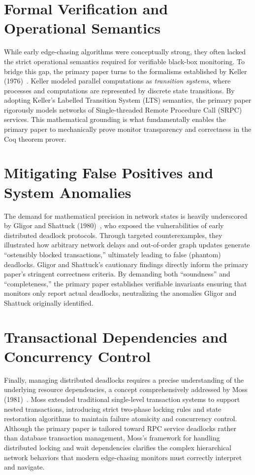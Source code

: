 \documentclass{llncs}
\begin{document}
\section{Formal Verification and Operational Semantics}

While early edge-chasing algorithms were conceptually strong, they often
lacked the strict operational semantics required for verifiable
black-box monitoring. To bridge this gap, the primary paper turns to the
formalisms established by Keller (1976)~\cite{37formals}. Keller modeled
parallel computations as \emph{transition systems}, where processes and
computations are represented by discrete state transitions. By adopting
Keller's Labelled Transition System (LTS) semantics, the primary paper
rigorously models networks of Single-threaded Remote Procedure Call
(SRPC) services. This mathematical grounding is what fundamentally
enables the primary paper to mechanically prove monitor transparency and
correctness in the Coq theorem prover.

\section{Mitigating False Positives and System Anomalies}

The demand for mathematical precision in network states is heavily
underscored by Gligor and Shattuck (1980)~\cite{30deadlock}, who exposed
the vulnerabilities of early distributed deadlock protocols. Through
targeted counterexamples, they illustrated how arbitrary network delays
and out-of-order graph updates generate ``ostensibly blocked
transactions,'' ultimately leading to false (phantom) deadlocks. Gligor
and Shattuck's cautionary findings directly inform the primary paper's
stringent correctness criteria. By demanding both ``soundness'' and
``completeness,'' the primary paper establishes verifiable invariants
ensuring that monitors only report actual deadlocks, neutralizing the
anomalies Gligor and Shattuck originally identified.

\section{Transactional Dependencies and Concurrency Control}

Finally, managing distributed deadlocks requires a precise understanding
of the underlying resource dependencies, a concept comprehensively
addressed by Moss (1981)~\cite{54distributed}. Moss extended traditional
single-level transaction systems to support nested transactions,
introducing strict two-phase locking rules and state restoration
algorithms to maintain failure atomicity and concurrency control.
Although the primary paper is tailored toward RPC service deadlocks
rather than database transaction management, Moss's framework for
handling distributed locking and wait dependencies clarifies the complex
hierarchical network behaviors that modern edge-chasing monitors must
correctly interpret and navigate.



\end{document}
